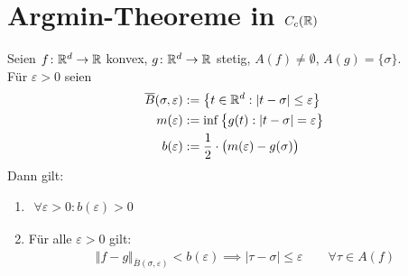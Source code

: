 
\section{Argmin-Theoreme in \texorpdfstring{$C_c(\mathbb{R})$}{C\_c(R)}} %

\begin{lemma}\label{lemma10.1}
	Seien $f\colon\mathbb{R}^d\to\mathbb{R}$ konvex, $g\colon\mathbb{R}^d\to\mathbb{R}$ stetig, $A(f)\neq\emptyset$, $A(g)=\lbrace\sigma\rbrace$.\\
	Für $\varepsilon>0$ seien
	\begin{align*}
		\overline{B}(\sigma,\varepsilon)&:=\big\lbrace t\in\mathbb{R}^d:|t-\sigma|\leq\varepsilon\big\rbrace\\
		m(\varepsilon)&:=\inf\limits\big\lbrace g(t):|t-\sigma|=\varepsilon\big\rbrace\\
		b(\varepsilon)&:=\frac{1}{2}\cdot\big(m(\varepsilon)-g(\sigma)\big)
	\end{align*}
	Dann gilt:
	\begin{enumerate}[label=(\arabic*)]
		\item $\begin{aligned}
			\forall\varepsilon>0:b(\varepsilon)>0
		\end{aligned}$
		\item Für alle $\varepsilon>0$ gilt:
		\begin{align*}
			\Vert f-g\Vert_{\overline{B}(\sigma,\varepsilon)}<b(\varepsilon)
			\implies|\tau-\sigma|\leq\varepsilon\qquad\forall\tau\in A(f)
		\end{align*}
	\end{enumerate}
\end{lemma}

